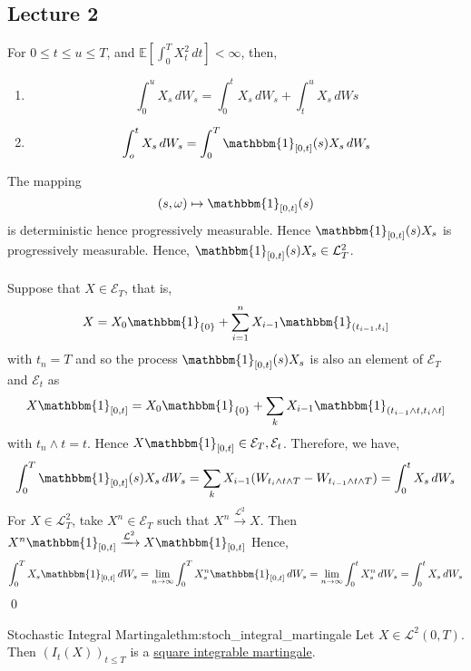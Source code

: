 \documentclass[12pt,a4paper]{article}
\newcommand{\E}{\mathbb{E}}
\renewenvironment{proof}
    {\begin{trivlist}\item[\hskip\labelsep\color{blue}\bfseries Proof:]}
    {\qed\end{trivlist}}
\begin{document}
\subsection{Lecture 2}
\begin{lemma}{}{}
    For $0\le t\le u\le T$, and $\E\left[\int_0^T X_t^2\,dt\right]<\infty$, then,
    \begin{enumerate}
        \item[1)]
        $$
        \int_0^u X_s\, dW_s = \int_0^t X_s\,dW_s + \int_t^u X_s\, dWs
        $$
        \item[2)]
        $$
        \int_o^t X_s\,dW_s = \int_0^T \mathbbm{1}_{[0,t]}(s) X_s\,dW_s
        $$
    \end{enumerate}
\end{lemma}
\begin{proof}
    The mapping
    $$
    (s,\omega)\mapsto \mathbbm{1}_{[0,t]}(s)
    $$
    is deterministic hence progressively measurable. Hence $\mathbbm{1}_{[0,t]}(s)X_s$ is progressively measurable. Hence, $\mathbbm{1}_{[0,t]}(s)X_s\in \mathcal{L}_T^2$.\\
    \\
    Suppose that $X\in \mathcal{E}_T$, that is,
    $$
    X = X_0\mathbbm{1}_{\{0\}} + \sum_{i=1}^n X_{i-1}\mathbbm{1}_{(t_{i-1},t_i]}
    $$
    with $t_n=T$ and so the process $\mathbbm{1}_{[0,t]}(s)X_s$ is also an element of $\mathcal{E}_T$ and $\mathcal{E}_t$ as
    $$
    X\mathbbm{1}_{[0,t]} = X_0\mathbbm{1}_{\{0\}} + \sum_k X_{i-1}\mathbbm{1}_{(t_{i-1}\wedge t, t_i\wedge t]}
    $$
    with $t_n\wedge t = t$. Hence $X\mathbbm{1}_{[0,t]}\in\mathcal{E}_T, \mathcal{E}_t$. Therefore, we have,
    \begin{align*}
        \int_0^T \mathbbm{1}_{[0,t]}(s)X_s\,dW_s = \sum_{k} X_{i-1}(W_{t_i\wedge t\wedge T}- W_{t_{i-1}\wedge t\wedge T}) = \int_0^t X_s\, dW_s
    \end{align*}
    For $X\in\mathcal{L}_T^2$, take $X^n\in\mathscr{E}_T$ such that $X^n\xrightarrow{\mathcal{L}^2} X$. Then $X^n\mathbbm{1}_{[0,t]}\xrightarrow{\mathcal{L}^2}X\mathbbm{1}_{[0,t]}$ Hence,
    $$
    \int_0^T X_s\mathbbm{1}_{[0,t]}\,dW_s = \lim_{n\to\infty} \int_0^T X^n_s\mathbbm{1}_{[0,t]}\,dW_s = \lim_{n\to\infty} \int_0^t X^n_s\,dW_s = \int_0^t X_s\,dW_s
    $$
\end{proof}
\pagebreak
\begin{theorem}{Stochastic Integral Martingale}{thm:stoch_integral_martingale}
Let $X\in\mathcal{L}^2(0,T)$. Then $(I_t(X))_{t\le T}$ is a \underline{square integrable martingale}.
\end{theorem}
\end{document}
